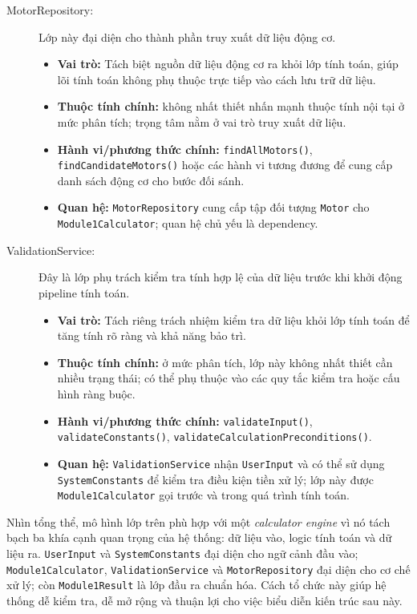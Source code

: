 \documentclass[a4paper]{article}
\begin{document}
\begin{description}
    \item[MotorRepository:]
    Lớp này đại diện cho thành phần truy xuất dữ liệu động cơ.
    \begin{itemize}
        \item \textbf{Vai trò:} Tách biệt nguồn dữ liệu động cơ ra khỏi lớp tính toán, giúp lõi tính toán không phụ thuộc trực tiếp vào cách lưu trữ dữ liệu.
        \item \textbf{Thuộc tính chính:} không nhất thiết nhấn mạnh thuộc tính nội tại ở mức phân tích; trọng tâm nằm ở vai trò truy xuất dữ liệu.
        \item \textbf{Hành vi/phương thức chính:} \texttt{findAllMotors()}, \texttt{findCandidateMotors()} hoặc các hành vi tương đương để cung cấp danh sách động cơ cho bước đối sánh.
        \item \textbf{Quan hệ:} \texttt{MotorRepository} cung cấp tập đối tượng \texttt{Motor} cho \texttt{Module1Calculator}; quan hệ chủ yếu là dependency.
    \end{itemize}

    \item[ValidationService:]
    Đây là lớp phụ trách kiểm tra tính hợp lệ của dữ liệu trước khi khởi động pipeline tính toán.
    \begin{itemize}
        \item \textbf{Vai trò:} Tách riêng trách nhiệm kiểm tra dữ liệu khỏi lớp tính toán để tăng tính rõ ràng và khả năng bảo trì.
        \item \textbf{Thuộc tính chính:} ở mức phân tích, lớp này không nhất thiết cần nhiều trạng thái; có thể phụ thuộc vào các quy tắc kiểm tra hoặc cấu hình ràng buộc.
        \item \textbf{Hành vi/phương thức chính:} \texttt{validateInput()}, \texttt{validateConstants()}, \texttt{validateCalculationPreconditions()}.
        \item \textbf{Quan hệ:} \texttt{ValidationService} nhận \texttt{UserInput} và có thể sử dụng \texttt{SystemConstants} để kiểm tra điều kiện tiền xử lý; lớp này được \texttt{Module1Calculator} gọi trước và trong quá trình tính toán.
    \end{itemize}
\end{description}

Nhìn tổng thể, mô hình lớp trên phù hợp với một \textit{calculator engine} vì nó tách bạch ba khía cạnh quan trọng của hệ thống: dữ liệu vào, logic tính toán và dữ liệu ra. \texttt{UserInput} và \texttt{SystemConstants} đại diện cho ngữ cảnh đầu vào; \texttt{Module1Calculator}, \texttt{ValidationService} và \texttt{MotorRepository} đại diện cho cơ chế xử lý; còn \texttt{Module1Result} là lớp đầu ra chuẩn hóa. Cách tổ chức này giúp hệ thống dễ kiểm tra, dễ mở rộng và thuận lợi cho việc biểu diễn kiến trúc sau này.
\end{document}
